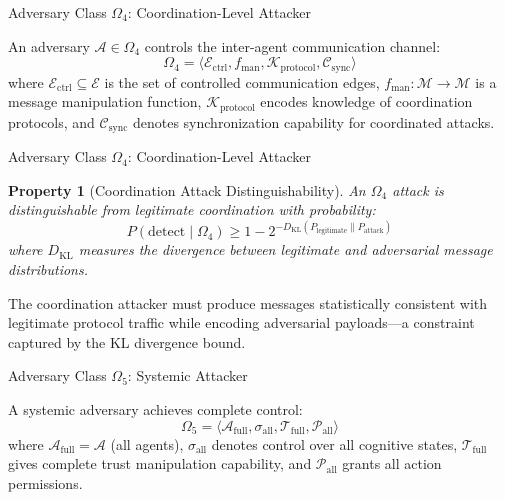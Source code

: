 \documentclass[
  ignorenonframetext,
]{beamer}
\newtheorem{property}{Property}
\begin{document}
\begin{frame}[allowframebreaks]{Adversary Class \(\Omega_4\):
Coordination-Level Attacker}
\protect{}\label{adversary-class-omega_4-coordination-level-attacker}
\begin{definition}
\label{def:omega4}
An adversary $\mathcal{A} \in \Omega_4$ controls the inter-agent communication channel:
\begin{equation}
\label{eq:omega4-formal}
\Omega_4 = \langle \mathcal{E}_{\text{ctrl}}, f_{\text{man}}, \mathcal{K}_{\text{protocol}}, \mathcal{C}_{\text{sync}} \rangle
\end{equation}
where $\mathcal{E}_{\text{ctrl}} \subseteq \mathcal{E}$ is the set of controlled communication edges, $f_{\text{man}}: \mathcal{M} \to \mathcal{M}$ is a message manipulation function, $\mathcal{K}_{\text{protocol}}$ encodes knowledge of coordination protocols, and $\mathcal{C}_{\text{sync}}$ denotes synchronization capability for coordinated attacks.
\end{definition}

\end{frame}

\begin{frame}[allowframebreaks]{Adversary Class \(\Omega_4\):
Coordination-Level Attacker}
\begin{property}[Coordination Attack Distinguishability]
\label{prop:omega4-distinguish}
An $\Omega_4$ attack is distinguishable from legitimate coordination with probability:
\begin{equation}
\label{eq:omega4-distinguish}
P(\text{detect} \mid \Omega_4) \geq 1 - 2^{-D_{\mathrm{KL}}(P_{\text{legitimate}} \| P_{\text{attack}})}
\end{equation}
where $D_{\mathrm{KL}}$ measures the divergence between legitimate and adversarial message distributions.
\end{property}

The coordination attacker must produce messages statistically consistent
with legitimate protocol traffic while encoding adversarial payloads---a
constraint captured by the KL divergence bound.
\end{frame}

\begin{frame}[allowframebreaks]{Adversary Class \(\Omega_5\): Systemic
Attacker}
\protect{}\label{adversary-class-omega_5-systemic-attacker}
\begin{definition}
\label{def:omega5}
A systemic adversary achieves complete control:
\begin{equation}
\label{eq:omega5-formal}
\Omega_5 = \langle \mathcal{A}_{\text{full}}, \sigma_{\text{all}}, \mathcal{T}_{\text{full}}, \mathcal{P}_{\text{all}} \rangle
\end{equation}
where $\mathcal{A}_{\text{full}} = \mathcal{A}$ (all agents), $\sigma_{\text{all}}$ denotes control over all cognitive states, $\mathcal{T}_{\text{full}}$ gives complete trust manipulation capability, and $\mathcal{P}_{\text{all}}$ grants all action permissions.
\end{definition}

\end{frame}
\end{document}
